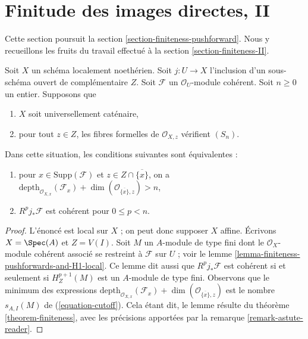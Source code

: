 \section{Finitude des images directes, II}
\label{section-finiteness-pushforward-II}

\noindent
Cette section poursuit la section \ref{section-finiteness-pushforward}. Nous y recueillons les fruits du travail effectué à la section \ref{section-finiteness-II}.

\begin{lemma}
\label{lemma-finiteness-Rjstar}
Soit $X$ un schéma localement noethérien. Soit $j : U \to X$ l'inclusion d'un sous-schéma ouvert de complémentaire $Z$. Soit $\mathcal{F}$ un $\mathcal{O}_U$-module cohérent. Soit $n \geq 0$ un entier. Supposons que
\begin{enumerate}
\item $X$ soit universellement caténaire,
\item pour tout $z \in Z$, les fibres formelles de $\mathcal{O}_{X, z}$ vérifient $(S_n)$.
\end{enumerate}
Dans cette situation, les conditions suivantes sont équivalentes :
\begin{enumerate}
\item[(a)] pour $x \in \text{Supp}(\mathcal{F})$ et $z \in Z \cap \overline{\{x\}}$, on a $\text{depth}_{\mathcal{O}_{X, x}}(\mathcal{F}_x) +
\dim(\mathcal{O}_{\overline{\{x\}}, z}) > n$,
\item[(b)] $R^pj_*\mathcal{F}$ est cohérent pour $0 \leq p < n$.
\end{enumerate}
\end{lemma}

\begin{proof}
L'énoncé est local sur $X$ ; on peut donc supposer $X$ affine. Écrivons $X = \Spec(A)$ et $Z = V(I)$. Soit $M$ un $A$-module de type fini dont le $\mathcal{O}_X$-module cohérent associé se restreint à $\mathcal{F}$ sur $U$ ; voir le lemme \ref{lemma-finiteness-pushforwards-and-H1-local}. Ce lemme dit aussi que $R^pj_*\mathcal{F}$ est cohérent si et seulement si $H^{p + 1}_Z(M)$ est un $A$-module de type fini. Observons que le minimum des expressions $\text{depth}_{\mathcal{O}_{X, x}}(\mathcal{F}_x) +
\dim(\mathcal{O}_{\overline{\{x\}}, z})$ est le nombre $s_{A, I}(M)$ de (\ref{equation-cutoff}). Cela étant dit, le lemme résulte du théorème \ref{theorem-finiteness}, avec les précisions apportées par la remarque \ref{remark-astute-reader}.
\end{proof}

